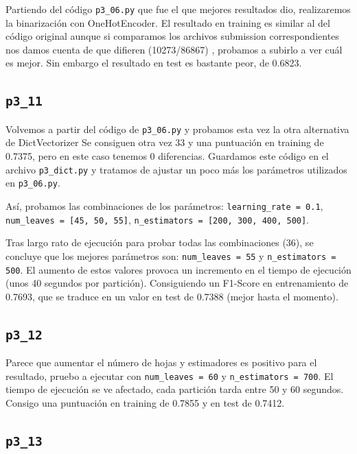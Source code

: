 \documentclass[a4paper, 20pt]{article}
\begin{document}
Partiendo del código \texttt{p3\_06.py} que fue el que mejores resultados dio, realizaremos la binarización con OneHotEncoder.
El resultado en training es similar al del código original aunque si comparamos los archivos submission correspondientes nos damos cuenta de que difieren (10273/86867)
, probamos a subirlo a ver cuál es mejor. Sin embargo el resultado en test es bastante peor, de 0.6823.

\subsection{\texttt{p3\_11}}

Volvemos a partir del código de \texttt{p3\_06.py} y probamos esta vez la otra alternativa de %
DictVectorizer %
Se consiguen otra vez 33 y una puntuación en training de 0.7375, pero en este caso tenemos 0 diferencias. Guardamos este código en el archivo \texttt{p3\_dict.py} y tratamos de ajustar un poco más los parámetros utilizados en \texttt{p3\_06.py}.

Así, probamos las combinaciones de los parámetros: \texttt{learning\_rate = 0.1}, \texttt{num\_leaves = [45, 50, 55]}, \texttt{n\_estimators = [200, 300, 400, 500]}.

Tras largo rato de ejecución para probar todas las combinaciones (36), se concluye que los mejores parámetros son: \texttt{num\_leaves = 55} y \texttt{n\_estimators = 500}. El aumento de estos valores provoca un incremento en el tiempo de ejecución (unos 40 segundos por partición). Consiguiendo un F1-Score en entrenamiento de 0.7693, que se traduce en un valor en test de 0.7388 (mejor hasta el momento).

\subsection{\texttt{p3\_12}}

Parece que aumentar el número de hojas y estimadores es positivo para el resultado, pruebo a ejecutar con \texttt{num\_leaves = 60} y \texttt{n\_estimators = 700}. El tiempo de ejecución se ve afectado, cada partición tarda entre 50 y 60 segundos. Consigo una puntuación en training de 0.7855 y en test de 0.7412.

\subsection{\texttt{p3\_13}}
\end{document}
